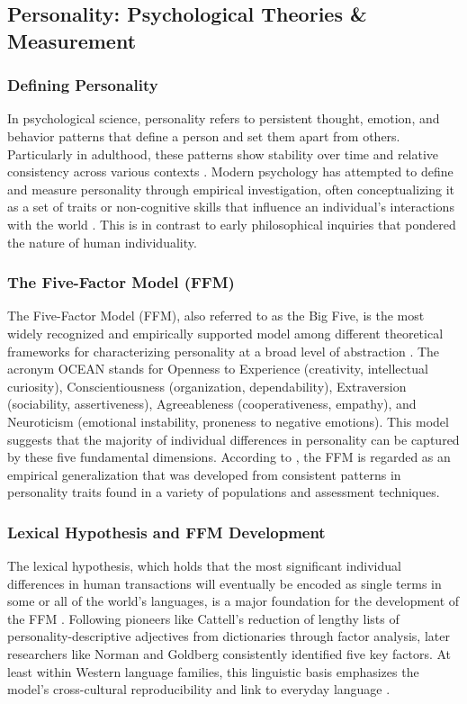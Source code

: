 \documentclass{DESSThesis}
\begin{document}
\subsection{Personality: Psychological Theories \& Measurement}
\subsubsection{Defining Personality}
In psychological science, personality refers to persistent thought, emotion, and behavior patterns that define a person and set them apart from others. Particularly in adulthood, these patterns show stability over time and relative consistency across various contexts \cite{feng_five-factor_2024,mccrae_reinterpreting_1989}. Modern psychology has attempted to define and measure personality through empirical investigation, often conceptualizing it as a set of traits or non-cognitive skills that influence an individual's interactions with the world \cite{kamarulzaman_confirmatory_2012,cobb-clark_stability_2012}. This is in contrast to early philosophical inquiries that pondered the nature of human individuality.

\subsubsection{The Five-Factor Model (FFM)}
The Five-Factor Model (FFM), also referred to as the Big Five, is the most widely recognized and empirically supported model among different theoretical frameworks for characterizing personality at a broad level of abstraction \cite{feng_five-factor_2024,okeefe_introducing_2012,rammstedt_big_2014}. The acronym OCEAN stands for Openness to Experience (creativity, intellectual curiosity), Conscientiousness (organization, dependability), Extraversion (sociability, assertiveness), Agreeableness (cooperativeness, empathy), and Neuroticism (emotional instability, proneness to negative emotions). This model suggests that the majority of individual differences in personality can be captured by these five fundamental dimensions. According to \cite{feng_five-factor_2024}, the FFM is regarded as an empirical generalization that was developed from consistent patterns in personality traits found in a variety of populations and assessment techniques.

\subsubsection{Lexical Hypothesis and FFM Development}
The lexical hypothesis, which holds that the most significant individual differences in human transactions will eventually be encoded as single terms in some or all of the world's languages, is a major foundation for the development of the FFM \cite{rammstedt_big_2014,feng_five-factor_2024}. Following pioneers like Cattell's reduction of lengthy lists of personality-descriptive adjectives from dictionaries through factor analysis, later researchers like Norman and Goldberg \cite{feng_five-factor_2024} consistently identified five key factors. At least within Western language families, this linguistic basis emphasizes the model's cross-cultural reproducibility and link to everyday language \cite{rammstedt_big_2014}.
\end{document}
